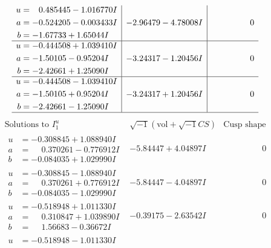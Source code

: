 \documentclass[1p]{elsarticle_modified}
\theoremstyle{definition}
\newcommand{\I}{\sqrt{-1}}
\begin{document}
$$\begin{array}{c|c|c}
\begin{aligned}
u &= \phantom{-}0.485445 - 1.016770 I \\
a &= -0.524205 - 0.003433 I \\
b &= -1.67733 + 1.65044 I\end{aligned}
 & -2.96479 - 4.78008 I & \phantom{-0.000000 } 0 \\ \hline\begin{aligned}
u &= -0.444508 + 1.039410 I \\
a &= -1.50105 - 0.95204 I \\
b &= -2.42661 + 1.25090 I\end{aligned}
 & -3.24317 - 1.20456 I & \phantom{-0.000000 } 0 \\ \hline\begin{aligned}
u &= -0.444508 - 1.039410 I \\
a &= -1.50105 + 0.95204 I \\
b &= -2.42661 - 1.25090 I\end{aligned}
 & -3.24317 + 1.20456 I & \phantom{-0.000000 } 0\\
 \hline 
 \end{array}$$\newpage$$\begin{array}{c|c|c}  
\text{Solutions to }I^u_{1}& \I (\text{vol} + \sqrt{-1}CS) & \text{Cusp shape}\\
 \hline 
\begin{aligned}
u &= -0.308845 + 1.088940 I \\
a &= \phantom{-}0.370261 - 0.776912 I \\
b &= -0.084035 + 1.029990 I\end{aligned}
 & -5.84447 + 4.04897 I & \phantom{-0.000000 } 0 \\ \hline\begin{aligned}
u &= -0.308845 - 1.088940 I \\
a &= \phantom{-}0.370261 + 0.776912 I \\
b &= -0.084035 - 1.029990 I\end{aligned}
 & -5.84447 - 4.04897 I & \phantom{-0.000000 } 0 \\ \hline\begin{aligned}
u &= -0.518948 + 1.011330 I \\
a &= \phantom{-}0.310847 + 1.039890 I \\
b &= \phantom{-}1.56683 - 0.36672 I\end{aligned}
 & -0.39175 - 2.63542 I & \phantom{-0.000000 } 0 \\ \hline\begin{aligned}
u &= -0.518948 - 1.011330 I \\

\end{aligned}
\end{array}$$
\end{document}
